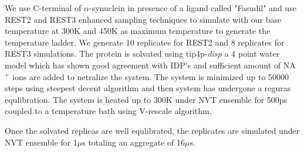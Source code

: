 We use C-terminal of $\alpha$-synuclein in presence of a ligand called "Fasudil" and use REST2 and REST3 enhanced sampling techniques to simulate with our base temperature at 300K and 450K as maximum temperature to generate the temperature ladder.
We generate 10 replicates for REST2 and 8 replicates for REST3 simulations.
The protein is solvated using tip4p-\textit{disp} a 4 point water model which has shown good agreement with IDP's and sufficient amount of NA$^{+}$ ions are added to netralize the system.
The system is minimized up to 50000 steps using steepest decent algorithm and then system has undergone a reguras equlibration.
The system is heated up to 300K under NVT ensemble for 500ps coupled to a temperature bath using V-rescale algorithm.
 
Once the solvated replicas are well equlibrated, the replicates are simulated under NVT ensemble for 1$\mu$s totaling an aggregate of 16$\mu$s.

